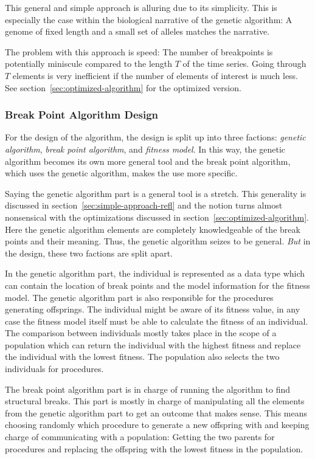 This general and simple approach is alluring due to its simplicity. This is
especially the case within the biological narrative of the genetic algorithm: A
genome of fixed length and a small set of alleles matches the narrative. 

The problem with this approach is speed: The number of breakpoints is potentially miniscule compared
to the length $T$ of the time series. Going through $T$ elements is very
inefficient if the number of elements of interest is much less. See
section~\ref{sec:optimized-algorithm} for the optimized version. 

\subsubsection{Break Point Algorithm Design}

For the design of the algorithm, the design is split up into three factions:
\textit{genetic algorithm}, \textit{break point algorithm}, and \textit{fitness
model}. In this way, the genetic algorithm
becomes its own more general tool and the break point algorithm, which uses the
genetic algorithm, makes the use more specific. 

Saying the genetic algorithm part is a general tool is a stretch. This
generality is discussed in section~\ref{sec:simple-approach-refl} and the notion
turns almost nonsensical with the optimizations discussed in
section~\ref{sec:optimized-algorithm}. Here the genetic algorithm elements are
completely knowledgeable of the break points and their meaning. Thus, the
genetic algorithm seizes to be general. \textit{But} in
the design, these two factions are split apart. 

In the genetic algorithm part, the individual is represented as a data type
which can contain the location of break points and the model information for the
fitness model. The genetic algorithm part is also responsible for the procedures
generating offsprings. The individual might be aware of its fitness value, in
any case the fitness model itself must be able to calculate the fitness of an
individual. The comparison between individuals mostly takes place in the scope
of a population which can return the individual with the highest fitness and
replace the individual with the lowest fitness. The population also selects the
two individuals for procedures. 

The break point algorithm part is in charge of running the algorithm to find
structural breaks. This part is mostly in charge of manipulating all the
elements from the genetic algorithm part to get an outcome that makes sense.
This means choosing randomly which procedure to generate a new offspring with
and keeping charge of communicating with a population: Getting the two parents
for procedures and replacing the offspring with the lowest fitness in the
population.  

